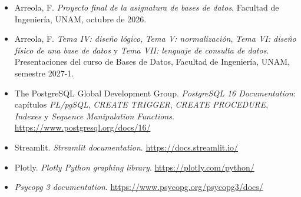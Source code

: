\documentclass[12pt,a4paper]{article}
\begin{document}
\begin{itemize}[leftmargin=1.2cm, itemsep=0.5em]
\item Arreola, F. \emph{Proyecto final de la asignatura de bases de datos}.
Facultad de Ingeniería, UNAM, octubre de 2026.
\item Arreola, F. \emph{Tema IV: diseño lógico}, \emph{Tema V: normalización},
\emph{Tema VI: diseño físico de una base de datos} y \emph{Tema VII: lenguaje de
consulta de datos}. Presentaciones del curso de Bases de Datos, Facultad de
Ingeniería, UNAM, semestre 2027-1.
\item The PostgreSQL Global Development Group. \emph{PostgreSQL 16 Documentation}:
capítulos \emph{PL/pgSQL}, \emph{CREATE TRIGGER}, \emph{CREATE PROCEDURE},
\emph{Indexes} y \emph{Sequence Manipulation Functions}.
\url{https://www.postgresql.org/docs/16/}
\item Streamlit. \emph{Streamlit documentation}. \url{https://docs.streamlit.io/}
\item Plotly. \emph{Plotly Python graphing library}. \url{https://plotly.com/python/}
\item \emph{Psycopg 3 documentation}. \url{https://www.psycopg.org/psycopg3/docs/}
\end{itemize}
\end{document}
